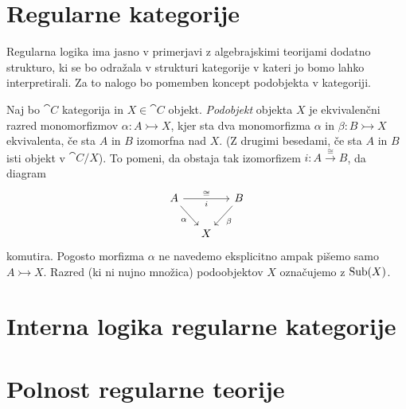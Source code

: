 \section{Regularne kategorije}
Regularna logika ima jasno v primerjavi z algebrajskimi teorijami dodatno strukturo, ki se bo odražala v strukturi kategorije v kateri jo bomo lahko interpretirali.
Za to nalogo bo pomemben koncept podobjekta v kategoriji.
\begin{definicija}
 Naj bo $\cat{C}$ kategorija in $X \in \cat{C}$ objekt.
 \emph{Podobjekt} objekta $X$ je ekvivalenčni razred monomorfizmov $\alpha : A \rightarrowtail X$, kjer sta dva monomorfizma $\alpha$ in $\beta : B \rightarrowtail X$ ekvivalenta, če sta $A$ in $B$ izomorfna nad $X$.
 (Z drugimi besedami, če sta $A$ in $B$ isti objekt v $\cat{C}/X$). To pomeni, da obstaja tak izomorfizem $i : A \xrightarrow{\cong} B$, da diagram
 \begin{equation*}
   \begin{tikzcd}[column sep=small]
     A \ar[rr, "i"']{a}{\cong} \ar[dr, "\alpha"'] & & B \ar[dl, "\beta"] \\
     & X &
   \end{tikzcd}
 \end{equation*}
 komutira. Pogosto morfizma $\alpha$ ne navedemo eksplicitno ampak pišemo samo $A \rightarrowtail X$. Razred (ki ni nujno množica) podoobjektov $X$ označujemo z $\operatorname{Sub}(X)$.
\end{definicija}
%
\section{Interna logika regularne kategorije}
%
\section{Polnost regularne teorije}